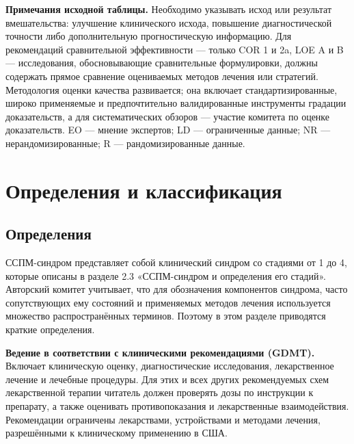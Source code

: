\documentclass[11pt,a4paper]{article}
\begin{document}
\textbf{Примечания исходной таблицы.} Необходимо указывать исход или результат вмешательства: улучшение клинического исхода, повышение диагностической точности либо дополнительную прогностическую информацию. Для рекомендаций сравнительной эффективности --- только COR 1 и 2a, LOE A и B --- исследования, обосновывающие сравнительные формулировки, должны содержать прямое сравнение оцениваемых методов лечения или стратегий. Методология оценки качества развивается; она включает стандартизированные, широко применяемые и предпочтительно валидированные инструменты градации доказательств, а для систематических обзоров --- участие комитета по оценке доказательств. EO --- мнение экспертов; LD --- ограниченные данные; NR --- нерандомизированные; R --- рандомизированные данные.


\section{Определения и классификация}
\subsection{Определения}
ССПМ-синдром представляет собой клинический синдром со стадиями от 1 до 4, которые описаны в разделе 2.3 «ССПМ-синдром и определения его стадий». Авторский комитет учитывает, что для обозначения компонентов синдрома, часто сопутствующих ему состояний и применяемых методов лечения используется множество распространённых терминов. Поэтому в этом разделе приводятся краткие определения.

\textbf{Ведение в соответствии с клиническими рекомендациями (GDMT).} Включает клиническую оценку, диагностические исследования, лекарственное лечение и лечебные процедуры. Для этих и всех других рекомендуемых схем лекарственной терапии читатель должен проверять дозы по инструкции к препарату, а также оценивать противопоказания и лекарственные взаимодействия. Рекомендации ограничены лекарствами, устройствами и методами лечения, разрешёнными к клиническому применению в США.
\end{document}
